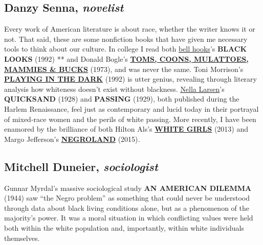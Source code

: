 \hypertarget{danzy-senna-novelist}{%
\subsection{\texorpdfstring{Danzy Senna,
\emph{novelist}}{Danzy Senna, novelist}}\label{danzy-senna-novelist}}

Every work of American literature is about race, whether the writer
knows it or not. That said, these are some nonfiction books that have
given me necessary tools to think about our culture. In college I read
both
\href{https://www.nytimes.com/2019/02/28/books/bell-hooks-min-jin-lee-aint-i-a-woman.html}{bell
hooks}'s \textbf{BLACK LOOKS} (1992) ** and Donald Bogle's
\textbf{\href{https://www.nytimes.com/1973/06/09/archives/greater-expectations-books-of-the-times-liberation-from-illusions.html}{TOMS,
COONS, MULATTOES, MAMMIES \& BUCKS}} (1973), and was never the same.
Toni Morrison's
\textbf{\href{https://www.nytimes.com/1992/04/05/books/the-clearest-eye.html}{PLAYING
IN THE DARK}} (1992) is utter genius, revealing through literary
analysis how whiteness doesn't exist without blackness.
\href{https://www.nytimes.com/2001/02/18/books/on-writers-and-writing-authentic-american.html}{Nella
Larsen}'s \textbf{QUICKSAND} (1928) and \textbf{PASSING} (1929), both
published during the Harlem Renaissance, feel just as contemporary and
lucid today in their portrayal of mixed-race women and the perils of
white passing. More recently, I have been enamored by the brilliance of
both Hilton Als's
\textbf{\href{https://www.nytimes.com/2013/11/10/books/review/white-girls-by-hilton-als.html}{WHITE
GIRLS}} (2013) and Margo Jefferson's
\textbf{\href{https://www.nytimes.com/2015/09/20/books/review/margo-jeffersons-negroland-a-memoir.html}{NEGROLAND}}
(2015)\emph{.}

\hypertarget{mitchell-duneier-sociologist}{%
\subsection{\texorpdfstring{Mitchell Duneier,
\emph{sociologist}}{Mitchell Duneier, sociologist}}\label{mitchell-duneier-sociologist}}

Gunnar Myrdal's massive sociological study \textbf{AN AMERICAN DILEMMA}
(1944) saw ``the Negro problem'' as something that could never be
understood through data about black living conditions alone, but as a
phenomenon of the majority's power. It was a moral situation in which
conflicting values were held both within the white population and,
importantly, within white individuals themselves.

